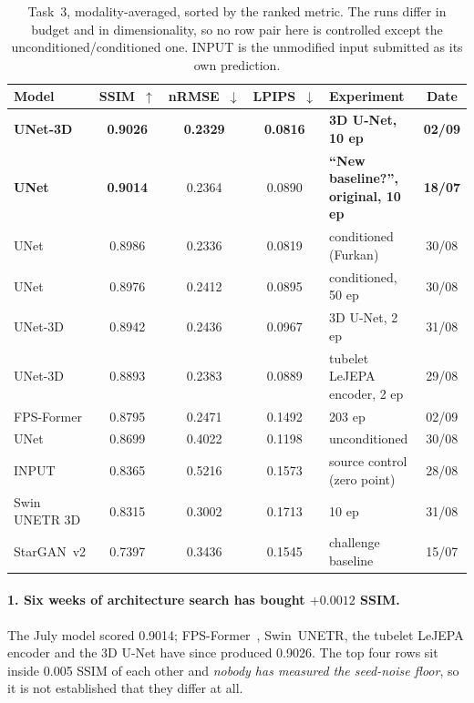 \documentclass[11pt,a4paper]{article}
\newcommand{\rmse}{nRMSE}
\newcommand{\best}[1]{\textbf{#1}}
\begin{document}
\begin{table}[H]
  \centering
  \small
  \caption{Task~3, modality-averaged, sorted by the ranked metric. The runs differ in budget and in
  dimensionality, so no row pair here is controlled except the unconditioned/conditioned one. INPUT is
  the unmodified input submitted as its own prediction.}
  \label{tab:position}
  \begin{tabular}{lccclc}
    \toprule
    Model & SSIM~$\uparrow$ & \rmse{}~$\downarrow$ & LPIPS~$\downarrow$ & Experiment & Date \\
    \midrule
    \best{UNet-3D} & \best{0.9026} & \best{0.2329} & \best{0.0816} & \best{3D U-Net, 10 ep} & \best{02/09} \\
    \best{UNet}    & \best{0.9014} & 0.2364 & 0.0890 & \best{``New baseline?'', original, 10 ep} & \best{18/07} \\
    UNet           & 0.8986 & 0.2336 & 0.0819 & conditioned (Furkan) & 30/08 \\
    UNet           & 0.8976 & 0.2412 & 0.0895 & conditioned, 50 ep & 30/08 \\
    UNet-3D        & 0.8942 & 0.2436 & 0.0967 & 3D U-Net, 2 ep & 31/08 \\
    UNet-3D        & 0.8893 & 0.2383 & 0.0889 & tubelet LeJEPA encoder, 2 ep & 29/08 \\
    FPS-Former     & 0.8795 & 0.2471 & 0.1492 & 203 ep & 02/09 \\
    UNet           & 0.8699 & 0.4022 & 0.1198 & unconditioned & 30/08 \\
    INPUT          & 0.8365 & 0.5216 & 0.1573 & source control (zero point) & 28/08 \\
    Swin UNETR 3D  & 0.8315 & 0.3002 & 0.1713 & 10 ep & 31/08 \\
    StarGAN~v2     & 0.7397 & 0.3436 & 0.1545 & challenge baseline & 15/07 \\
    \bottomrule
  \end{tabular}
\end{table}

\paragraph{1. Six weeks of architecture search has bought \texorpdfstring{$+0.0012$}{+0.0012} SSIM.} The
July model scored \num{0.9014}; FPS-Former~\cite{meng2025fpsformer}, Swin~UNETR, the tubelet LeJEPA
encoder and the 3D U-Net have since produced \num{0.9026}. The top four rows sit inside \num{0.005} SSIM of each other and
\emph{nobody has measured the seed-noise floor}, so it is not established that they differ at all.
\end{document}
